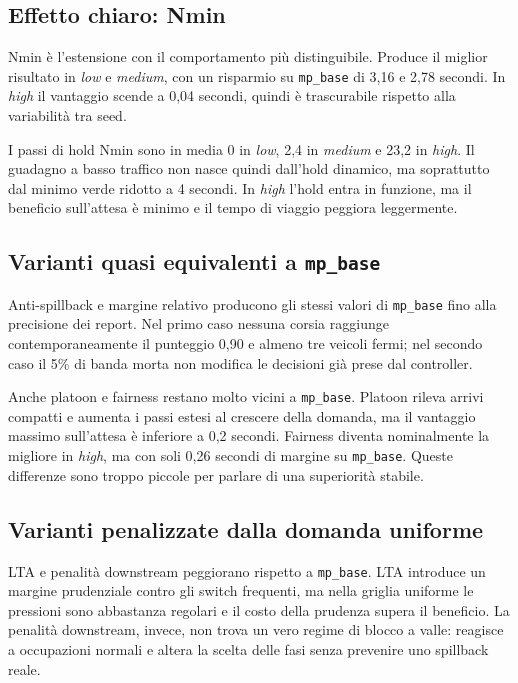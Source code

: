\documentclass[12pt,a4paper,oneside]{report}
\numberwithin{equation}{chapter}
\begin{document}
\subsection{Effetto chiaro: Nmin}

Nmin è l'estensione con il comportamento più distinguibile. Produce il miglior
risultato in \emph{low} e \emph{medium}, con un risparmio su \texttt{mp\_base} di 3,16 e 2,78
secondi. In \emph{high} il vantaggio scende a 0,04 secondi, quindi è trascurabile
rispetto alla variabilità tra seed.

I passi di hold Nmin sono in media 0 in \emph{low}, 2,4 in \emph{medium} e 23,2 in \emph{high}. Il
guadagno a basso traffico non nasce quindi dall'hold dinamico, ma soprattutto
dal minimo verde ridotto a 4 secondi. In \emph{high} l'hold entra in funzione, ma il
beneficio sull'attesa è minimo e il tempo di viaggio peggiora leggermente.

\subsection{Varianti quasi equivalenti a \texttt{mp\_base}}

Anti-spillback e margine relativo producono gli stessi valori di
\texttt{mp\_base} fino alla precisione dei report. Nel primo caso nessuna corsia
raggiunge contemporaneamente il punteggio 0,90 e almeno tre veicoli fermi; nel
secondo caso il 5\% di banda morta non modifica le decisioni già prese dal
controller.

Anche platoon e fairness restano molto vicini a \texttt{mp\_base}. Platoon rileva
arrivi compatti e aumenta i passi estesi al crescere della domanda, ma il
vantaggio massimo sull'attesa è inferiore a 0,2 secondi. Fairness diventa
nominalmente la migliore in \emph{high}, ma con soli 0,26 secondi di margine su
\texttt{mp\_base}. Queste differenze sono troppo piccole per parlare di una
superiorità stabile.

\subsection{Varianti penalizzate dalla domanda uniforme}

LTA e penalità downstream peggiorano rispetto a \texttt{mp\_base}. LTA introduce
un margine prudenziale contro gli switch frequenti, ma nella griglia uniforme le
pressioni sono abbastanza regolari e il costo della prudenza supera il beneficio.
La penalità downstream, invece, non trova un vero regime di blocco a valle:
reagisce a occupazioni normali e altera la scelta delle fasi senza prevenire uno
spillback reale.
\end{document}
